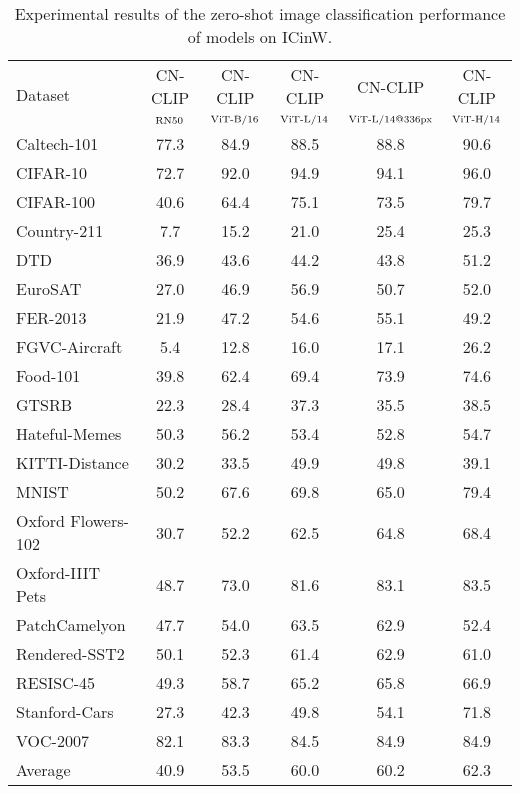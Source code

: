 \documentclass[11pt]{article}
\begin{document}
\begin{table*}[t]
\center
\small
\vskip 0.15in
\begin{adjustbox}{max width=1.\textwidth}
\begin{tabular}{@{\extracolsep{\fill}}lccccc}
\toprule
\multirow{2}{*}{Dataset} & CN-CLIP & CN-CLIP & CN-CLIP & CN-CLIP & CN-CLIP \\
 & $\rm_{RN50}$ & $\rm_{ViT\text{-}B/16}$ & $\rm_{ViT\text{-}L/14}$ & $\rm_{ViT\text{-}L/14@336px}$ & $\rm_{ViT\text{-}H/14}$ \\
\midrule
  Caltech-101  & 77.3 & 84.9 & 88.5 & 88.8 & 90.6  \\
  CIFAR-10  & 72.7 & 92.0 & 94.9 & 94.1 & 96.0  \\
  CIFAR-100   & 40.6 & 64.4 & 75.1 & 73.5 & 79.7  \\
  Country-211   & 7.7 & 15.2 & 21.0 & 25.4 & 25.3  \\
  DTD   & 36.9 & 43.6 & 44.2 & 43.8 & 51.2  \\
  EuroSAT   & 27.0 & 46.9 & 56.9 & 50.7 & 52.0  \\
  FER-2013   & 21.9 & 47.2 & 54.6 & 55.1 & 49.2  \\
  FGVC-Aircraft  & 5.4 & 12.8 & 16.0 & 17.1 & 26.2  \\
  Food-101   & 39.8 & 62.4 & 69.4 & 73.9 & 74.6  \\
  GTSRB   & 22.3 & 28.4 & 37.3 & 35.5 & 38.5  \\
  Hateful-Memes   & 50.3 & 56.2 & 53.4 & 52.8 & 54.7  \\
  KITTI-Distance  & 30.2 & 33.5 & 49.9 & 49.8 & 39.1  \\
  MNIST   & 50.2 & 67.6 &69.8 & 65.0 & 79.4  \\
  Oxford Flowers-102   & 30.7 & 52.2 &62.5 & 64.8 & 68.4  \\
  Oxford-IIIT Pets   & 48.7 & 73.0 &81.6 & 83.1 & 83.5  \\
  PatchCamelyon  & 47.7 & 54.0 & 63.5 & 62.9 & 52.4  \\
  Rendered-SST2  & 50.1 & 52.3 & 61.4 & 62.9 & 61.0  \\
  RESISC-45   & 49.3 & 58.7 & 65.2 & 65.8 & 66.9  \\
  Stanford-Cars  & 27.3 & 42.3 &49.8 & 54.1 & 71.8  \\
  VOC-2007  & 82.1 & 83.3 & 84.5 & 84.9 & 84.9  \\
  Average  & 40.9 & 53.5 & 60.0 & 60.2 & 62.3  \\
\bottomrule
\end{tabular}
\end{adjustbox}
\caption{Experimental results of the zero-shot image classification performance of models on ICinW. }
\label{tb:zs}
\end{table*}
\end{document}
